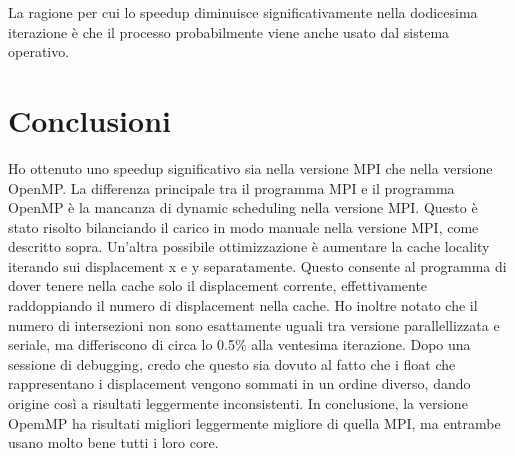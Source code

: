\documentclass[a4paper,11pt, twoside]{report}
\begin{document}
La ragione per cui lo speedup diminuisce significativamente nella dodicesima iterazione è che il processo probabilmente viene anche usato dal sistema operativo.
\section*{Conclusioni}
Ho ottenuto uno speedup significativo sia nella versione MPI che nella versione OpenMP.
La differenza principale tra il programma MPI e il programma OpenMP è la mancanza di dynamic scheduling nella versione MPI.
Questo è stato risolto bilanciando il carico in modo manuale nella versione MPI, come descritto sopra.
Un'altra possibile ottimizzazione è aumentare la cache locality iterando sui displacement x e y separatamente.
Questo consente al programma di dover tenere nella cache solo il displacement corrente, effettivamente raddoppiando il numero di displacement nella cache.
Ho inoltre notato che il numero di intersezioni non sono esattamente uguali tra versione parallellizzata e seriale, ma differiscono di circa lo 0.5\% alla ventesima iterazione.
Dopo una sessione di debugging, credo che questo sia dovuto al fatto che i float che rappresentano i displacement vengono sommati in un ordine diverso, dando origine così a risultati leggermente inconsistenti.
In conclusione, la versione OpemMP ha risultati migliori leggermente migliore di quella MPI, ma entrambe usano molto bene tutti i loro core.
\end{document}
